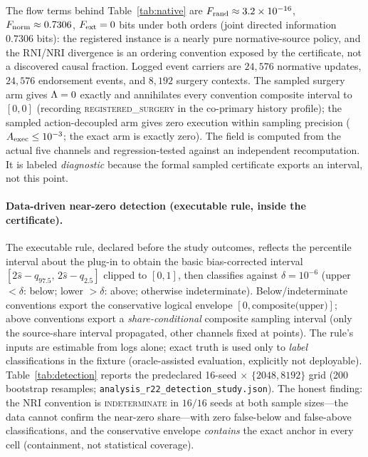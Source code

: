 The flow terms behind Table~\ref{tab:native} are
$F_{\mathrm{rand}}\approx3.2\times10^{-16}$, $F_{\mathrm{norm}}\approx0.7306$, $F_{\mathrm{ext}}=0$ bits under
both orders (joint directed information $0.7306$ bits): the registered
instance is a nearly pure normative-source policy, and the RNI/NRI divergence
is an ordering convention exposed by the certificate, not a discovered causal
fraction. Logged event carriers are $24{,}576$ normative updates, $24{,}576$
endorsement events, and $8{,}192$ surgery contexts. The sampled surgery arm
gives $\Lambda=0$ exactly and annihilates every convention composite interval to
$[0,0]$ (recording \textsc{registered\_surgery} in the co-primary history
profile); the sampled action-decoupled arm gives zero execution within
sampling precision ($A_{\mathrm{exec}}\le10^{-3}$; the exact arm is exactly zero). The
 field is computed from the actual
five channels and regression-tested against an independent recomputation. It is
labeled \emph{diagnostic} because the formal sampled certificate exports an
interval, not this point.

\paragraph{Data-driven near-zero detection (executable rule, inside the
certificate).}
The executable rule, declared before the study outcomes, reflects the
percentile interval about the plug-in to obtain the basic bias-corrected
interval $[2\hat s-q_{97.5},\,2\hat s-q_{2.5}]$ clipped to $[0,1]$, then
classifies against $\delta=10^{-6}$ (upper $<\delta$: below; lower $>\delta$:
above; otherwise indeterminate). Below/indeterminate conventions export the
conservative logical envelope $[0,\text{composite(upper)}]$; above conventions
export a \emph{share-conditional} composite sampling interval (only the
source-share interval propagated, other channels fixed at points). The rule's
inputs are estimable from logs alone; exact truth is used only to \emph{label}
classifications in the fixture (oracle-assisted evaluation, explicitly not
deployable). Table~\ref{tab:detection} reports the predeclared 16-seed $\times$
$\{2048,8192\}$ grid (200 bootstrap resamples;
\texttt{analysis\_r22\_detection\_study.json}). The honest finding: the NRI
convention is \textsc{indeterminate} in $16/16$ seeds at both sample sizes---the
data cannot confirm the near-zero share---with zero false-below and false-above
classifications, and the conservative envelope \emph{contains} the exact anchor
in every cell (containment, not statistical coverage).

